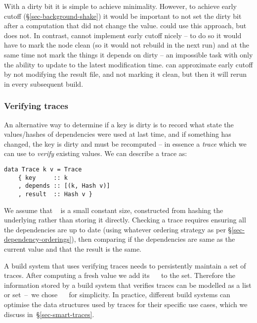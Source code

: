 With a dirty bit it is simple to achieve minimality. However, to achieve early cutoff
(\S\ref{sec-background-shake}) it would be important to not set the dirty bit
after a computation that did not change the value. \Excel could use this
approach, but does not. In contrast, \Make cannot implement early cutoff nicely -- to
do so it would have to mark the node clean (so it would not rebuild in the next
run) and at the same time not mark the things it depends on dirty -- an
impossible task with only the ability to update to the latest modification time.
\Make can approximate early cutoff by not modifying the result file, and not marking it clean,
but then it will rerun in every subsequent build.

\vspace{-2mm}
\subsubsection{Verifying traces}\label{sec-verifying-traces}

An alternative way to determine if a key is dirty is to record what state the
values/hashes of dependencies were used at last time, and if something has
changed, the key is dirty and must be recomputed -- in essence a \emph{trace}
which we can use to \emph{verify} existing values. We can describe a trace as:

\begin{verbatim}
data Trace k v = Trace
    { key     :: k
    , depends :: [(k, Hash v)]
    , result  :: Hash v }
\end{verbatim}

We assume that ~ is a small constant size, constructed from hashing the
underlying  rather than storing it directly. Checking a trace requires
ensuring all the dependencies are up to date (using whatever ordering strategy
as per \S\ref{sec-dependency-orderings}), then comparing if the dependencies are
same as the current value and that the result is the same.

A build system that uses verifying traces needs to persistently maintain a set
of traces. After computing a fresh value we add its ~~ to
the set. Therefore the information stored by a build system that verifies
traces can be modelled as a list or set~--~we chose \hs{[Trace}~~\hs{v]}
for simplicity. In practice, different build systems can optimise the data
structures used by traces for their specific use cases, which we discuss
in~\S\ref{sec-smart-traces}.

